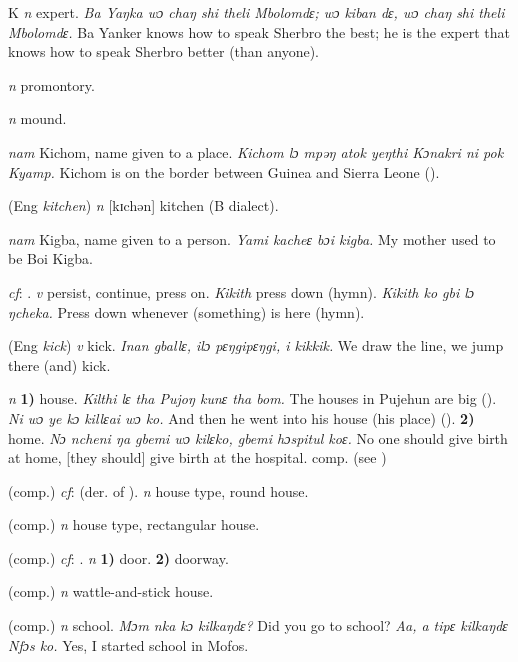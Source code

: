 \begin{letter}{K}
 \textit{n} expert. \textit{Ba Yaŋka wɔ chaŋ shi theli Mbolomdɛ; wɔ kiban dɛ, wɔ chaŋ shi theli Mbolomdɛ.} Ba Yanker knows how to speak Sherbro the best; he is the expert that knows how to speak Sherbro better (than anyone).

 \textit{n} promontory.

 \textit{n} mound.

 \textit{nam} Kichom, name given to a place. \textit{Kichom lɔ mpəŋ atok yeŋthi Kɔnakri ni pok Kyamp.} Kichom is on the border between Guinea and Sierra Leone (\citealt{Pichl1967}).

 (Eng \textit{kitchen}) \textit{n} [kɪchən] kitchen (B dialect). 

 \textit{nam} Kigba, name given to a person. \textit{Yami kacheɛ bɔi kigba.} My mother used to be Boi Kigba.

 \textit{cf}: . \textit{v} persist, continue, press on. \textit{Kikith} press down (hymn). \textit{Kikith ko gbi lɔ ŋcheka.} Press down whenever (something) is here (hymn). 

 (Eng \textit{kick}) \textit{v} kick. \textit{Inan gballɛ, ilɔ pɛŋgipɛŋgi, i kikkik.} We draw the line, we jump there (and) kick.

 \textit{n} \textbf{1)} house. \textit{Kilthi lɛ tha Pujoŋ kunɛ tha bom.} The houses in Pujehun are big (\citealt{Pichl1967}). \textit{Ni wɔ ye kɔ killɛai wɔ ko.} And then he went into his house (his place) (\citealt{Pichl1967}). \textbf{2)} home. \textit{Nɔ ncheni ŋa gbemi wɔ kilɛko, gbemi hɔspitul koɛ.} No one should give birth at home, [they should] give birth at the hospital. comp.  (see ) 

 (comp.) \textit{cf}:  (der. of ). \textit{n} house type, round house.

 (comp.) \textit{n} house type, rectangular house.

 (comp.) \textit{cf}: . \textit{n} \textbf{1)} door. \textbf{2)} doorway.

 (comp.) \textit{n} wattle-and-stick house.

 (comp.) \textit{n} school. \textit{Mɔm nka kɔ kilkaŋdɛ?} Did you go to school? \textit{Aa, a tipɛ kilkaŋdɛ Nfɔs ko.} Yes, I started school in Mofos.


\end{letter}
